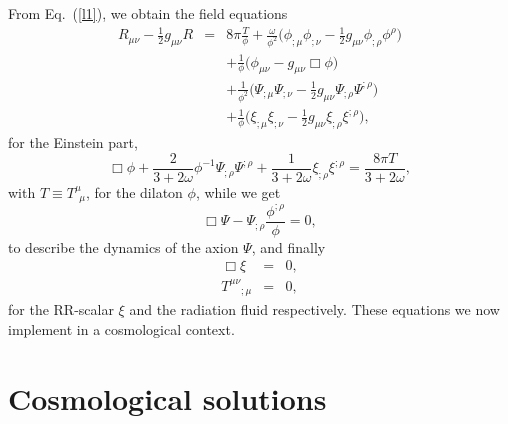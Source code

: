 \documentclass[a4paper,aps,twocolumn,prd,showpacs,nofootinbib]{revtex4}
\begin{document}
{}From Eq.~(\ref{l1}), we obtain the field equations
\begin{eqnarray}
R_{\mu\nu} - \frac{1}{2}g_{\mu\nu}R &=& 8\pi\frac{T}{\phi} +
\frac{\omega}{\phi^2}\biggr(\phi_{;\mu}\phi_{;\nu} -
\frac{1}{2}g_{\mu\nu}\phi_{;\rho}\phi^{\rho}\biggl) \nonumber \\ & &
+\frac{1}{\phi}\biggr(\phi_{\mu\nu} - g_{\mu\nu}\Box\phi\biggl)
\nonumber\\ & &+\frac{1}{\phi^2}\biggr(\Psi_{;\mu}\Psi_{;\nu} -
\frac{1}{2}g_{\mu\nu}\Psi_{;\rho} \Psi^{;\rho}\biggl) \nonumber \\ & &
+ \frac{1}{\phi}\biggr(\xi_{;\mu}\xi_{;\nu} -
\frac{1}{2}g_{\mu\nu}\xi_{;\rho}\xi^{;\rho}\biggl),
\end{eqnarray}
for the Einstein part,
\begin{equation}
\Box\phi + \frac{2}{3 + 2\omega}\phi^{-1}\Psi_{;\rho}\Psi^{;\rho} +
\frac{1}{3 + 2\omega}\xi_{;\rho}\xi^{;\rho} = \frac{8\pi T}{3 +
2\omega},
\end{equation}
with $T\equiv T^\mu_{\ \ \mu}$, for the dilaton $\phi$, while we get
\begin{equation}
\Box\Psi - \Psi_{;\rho}\frac{\phi^{;\rho}}{\phi}=0,
\end{equation}
to describe the dynamics of the axion $\Psi$, and finally
\begin{eqnarray}
\Box\xi &=& 0,\\ {T^{\mu\nu}}_{;\mu} &=& 0,
\end{eqnarray}
for the RR-scalar $\xi$ and the radiation fluid respectively. These
equations we now implement in a cosmological context.

\section{Cosmological solutions}
\end{document}
